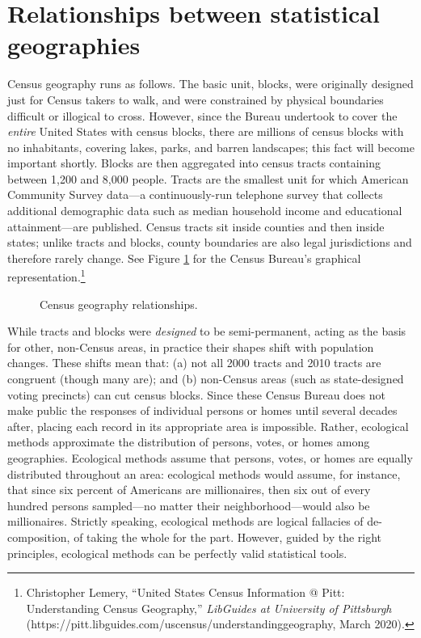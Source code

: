 \documentclass[12pt,oneside]{psthesis}
\begin{document}
\hypertarget{census-geography}{%
\section{Relationships between statistical geographies}\label{census-geography}}

Census geography runs as follows.
The basic unit, blocks, were originally designed just for Census takers to walk, and were constrained by physical boundaries difficult or illogical to cross.
However, since the Bureau undertook to cover the \emph{entire} United States with census blocks, there are millions of census blocks with no inhabitants, covering lakes, parks, and barren landscapes; this fact will become important shortly.
Blocks are then aggregated into census tracts containing between 1,200 and 8,000 people.
Tracts are the smallest unit for which American Community Survey data---a continuously-run telephone survey that collects additional demographic data such as median household income and educational attainment---are published.
Census tracts sit inside counties and then inside states; unlike tracts and blocks, county boundaries are also legal jurisdictions and therefore rarely change.
See Figure \ref{fig:geography} for the Census Bureau's graphical representation.\footnote{Christopher Lemery, ``United States Census Information @ Pitt: Understanding Census Geography,'' \emph{LibGuides at University of Pittsburgh} (https://pitt.libguides.com/uscensus/understandinggeography, March 2020).}
\begin{figure}

{\centering {}

}

\caption{Census geography relationships.}\label{fig:geography}
\end{figure}
While tracts and blocks were \emph{designed} to be semi-permanent, acting as the basis for other, non-Census areas, in practice their shapes shift with population changes.
These shifts mean that: (a) not all 2000 tracts and 2010 tracts are congruent (though many are); and (b) non-Census areas (such as state-designed voting precincts) can cut census blocks.
Since these Census Bureau does not make public the responses of individual persons or homes until several decades after, placing each record in its appropriate area is impossible.
Rather, ecological methods approximate the distribution of persons, votes, or homes among geographies.
Ecological methods assume that persons, votes, or homes are equally distributed throughout an area: ecological methods would assume, for instance, that since six percent of Americans are millionaires, then six out of every hundred persons sampled---no matter their neighborhood---would also be millionaires.
Strictly speaking, ecological methods are logical fallacies of de-composition, of taking the whole for the part.
However, guided by the right principles, ecological methods can be perfectly valid statistical tools.
\end{document}

